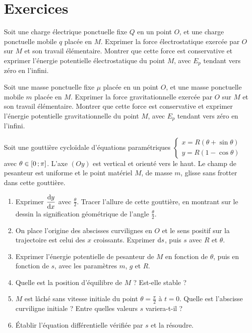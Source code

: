 \section{Exercices}
\label{chap4-sec:exercices}
\begin{exercice}
  Soit une charge électrique ponctuelle fixe $Q$ en un point $O$, et une charge ponctuelle mobile $q$ placée en $M$. Exprimer la force électrostatique exercée par $O$ sur $M$ et son travail élémentaire. Montrer que cette force est conservative et exprimer l'énergie potentielle électrostatique du point $M$, avec $E_p$ tendant vers zéro en l'infini.
\end{exercice}
%
\begin{exercice}
  Soit une masse ponctuelle fixe $\mu$ placée en un point $O$, et une masse ponctuelle mobile $m$ placée en $M$. Exprimer la force gravitationnelle exercée par $O$ sur $M$ et son travail élémentaire. Montrer que cette force est conservative et exprimer l'énergie potentielle gravitationnelle du point $M$, avec $E_p$ tendant vers zéro en l'infini.
\end{exercice}
%
\begin{exercice}
  Soit une gouttière cycloïdale d'équations paramétriques $\begin{cases} x = R(\theta +\sin\theta) \\ y=R(1-\cos\theta)\end{cases}$ avec $\theta \in \left[ 0 \, ;  \pi \right]$. L'axe $(Oy)$ est vertical et orienté vers le haut. Le champ de pesanteur est uniforme et le point matériel $M$, de masse $m$, glisse sans frotter dans cette gouttière.
  \begin{enumerate}
  \item Exprimer $\dfrac{\mathrm{d} y}{\mathrm{d} x}$ avec $\frac{\theta}{2}$. Tracer l'allure de cette gouttière, en montrant sur le dessin la signification géométrique de l'angle $\frac{\theta}{2}$.
  \item On place l'origine des abscisses curvilignes en $O$ et le sens positif sur la trajectoire est celui des $x$ croissants. Exprimer $\mathrm{d} s$, puis $s$ avec $R$ et $\theta$.
  \item Exprimer l'énergie potentielle de pesanteur de $M$ en fonction de $\theta$, puis en fonction de $s$, avec les paramètres $m$, $g$ et $R$.
  \item Quelle est la position d'équilibre de $M$ ? Est-elle stable ?
  \item $M$ est lâché sans vitesse initiale du point $\theta=\frac{\pi}{2}$ à $t=0$. Quelle est l'abscisse curviligne initiale ? Entre quelles valeurs $s$ variera-t-il ?
  \item Établir l'équation différentielle vérifiée par $s$ et la résoudre.
 \end{enumerate}
\end{exercice}
